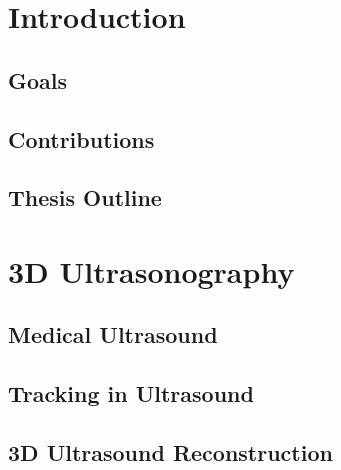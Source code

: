 \documentclass[12pt, twoside, a4paper]{book}
\begin{document}
\cleardoublepage

\pagestyle{fancy}
\fancyhead[R]{}

\chapter{Introduction}
	\setcounter{page}{1}
	
	
	
	\clearpage
	
	\section{Goals}
	
		
		
	\section{Contributions}
	
		
	
	\section{Thesis Outline}
	
		
	
\chapter{3D Ultrasonography}
	\label{chapter:3d_ultrasonography}
		
	
	
	\section{Medical Ultrasound}
	
		
		
	\section{Tracking in Ultrasound}
	
		
	
	\section{3D Ultrasound Reconstruction}
		\label{section:ultrasound_reconstruction}
	
\end{document}
